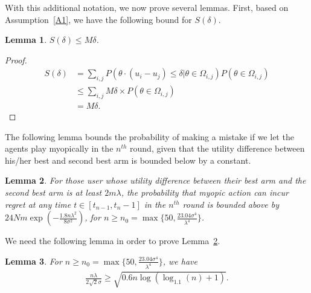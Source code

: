 \documentclass{article}
\newtheorem{lemma}{Lemma}
\begin{document}
With this additional notation, we now prove several lemmas.
First, based on Assumption~\ref{A1}, we have the following bound for $S(\delta)$.

\begin{lemma}
$S(\delta)\leq M\delta$.
\label{lemma:sdelta}
\end{lemma}

\begin{proof}
\begin{align*}
S(\delta)
&=\sum_{i,j}P(\theta\cdot(u_{i}-u_{j})\le \delta|\theta\in \Omega_{i,j})P(\theta\in \Omega_{i,j}) \\
&\leq \sum_{i,j}M\delta \times P(\theta\in \Omega_{i,j}) \\
&=M\delta.
\end{align*}
\end{proof}

The following lemma bounds the probability of making a mistake if we let the agents play myopically in the $n^{th}$ round, given that the utility difference between his/her best and second best arm is bounded below by a constant.

\begin{lemma}
For those user whose utility difference between their best arm and the second best arm is at least $2m\lambda$, the probability that myopic action can incur regret at any time $t\in [t_{n-1},t_{n}-1]$ in the $n^{th}$ round is bounded above by $24Nm\exp\left(-\frac{1.8n\lambda^2}{8\sigma^2}\right)$, for $n\geq n_{0}=\max\{50, \frac{23.04\sigma^4}{\lambda^4}\}$.
\label{round:prob}
\end{lemma}


We need the following lemma in order to prove Lemma~\ref{round:prob}.

\begin{lemma}
For $n\geq n_{0}=\max\{50, \frac{23.04\sigma^4}{\lambda^4}\}$, we have
\begin{align}
\frac{n\lambda}{2\sqrt{2}\sigma}\geq \sqrt{0.6n\log(\log_{1.1}(n)+1)}. \nonumber
\end{align}
\label{n0-inequality}
\end{lemma}
\end{document}
